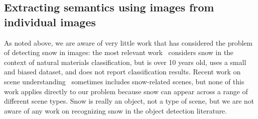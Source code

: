 %
%
%






\subsection{Extracting semantics using images from individual images}

As noted above, we are aware of very little work that has considered
the problem of detecting snow in images: the most relevant
work~\cite{singhal2003spatialcontext} considers snow in the context of
natural materials classification, but is over 10 years old, uses a
small and biased dataset, and does not report classification results.
Recent work on scene understanding~\cite{XiaoHEOT10} sometimes
includes snow-related scenes, but none of this work applies directly
to our problem because snow can appear across a range of different
scene types. Snow is really an object, not a type of scene, but we are
not aware of any work on recognizing snow in the object detection
literature.

